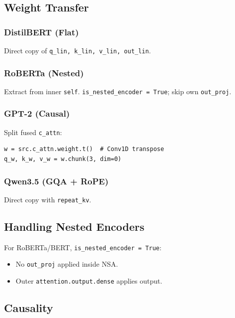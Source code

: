 \subsection{Weight Transfer}

\subsubsection{DistilBERT (Flat)}

Direct copy of \texttt{q\_lin, k\_lin, v\_lin, out\_lin}.

\subsubsection{RoBERTa (Nested)}

Extract from inner \texttt{self}. \texttt{is\_nested\_encoder = True}; skip own \texttt{out\_proj}.

\subsubsection{GPT-2 (Causal)}

Split fused \texttt{c\_attn}:

\begin{lstlisting}
w = src.c_attn.weight.t()  # Conv1D transpose
q_w, k_w, v_w = w.chunk(3, dim=0)
\end{lstlisting}

\subsubsection{Qwen3.5 (GQA + RoPE)}

Direct copy with \texttt{repeat\_kv}.

\subsection{Handling Nested Encoders}

For RoBERTa/BERT, \texttt{is\_nested\_encoder = True}:
\begin{itemize}
\item No \texttt{out\_proj} applied inside NSA.
\item Outer \texttt{attention.output.dense} applies output.

\end{itemize}
\subsection{Causality}

